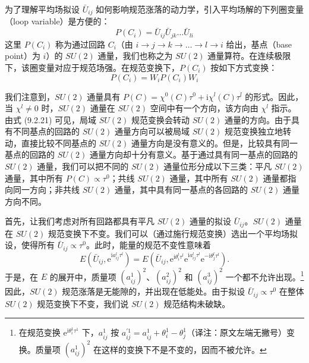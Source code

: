 为了理解平均场拟设 $\bar{U}_{ij}$ 如何影响规范涨落的动力学，引入平均场解的下列圈变量（loop variable）是方便的：
\begin{equation*}
P(C_i)=\bar{U}_{ij}\bar{U}_{jk}\dots\bar{U}_{li}
\tag{9.2.20}
\end{equation*}
这里 $P(C_i)$ 称为通过回路 $C_i$（由 $i\to j\to k\to\dots\to l\to i$ 给出，基点（base point）为 $i$）的 $SU(2)$ 通量，我们也称之为 $SU(2)$ 通量算符。在连续极限下，该圈变量对应于规范场强。在规范变换下，$P(C_i)$ 按如下方式变换：
\begin{equation*}
P(C_i)=W_iP(C_i)W_i
\tag{9.2.21}
\end{equation*}

我们注意到，$SU(2)$ 通量具有 $P(C)=\chi^{0}(C)\tau^{0}+\mathrm{i}\chi^{l}(C)\tau^{l}$ 的形式。因此，当 $\chi^{l}\neq 0$ 时，$SU(2)$ 通量在 $SU(2)$ 空间中有一个方向，该方向由 $\chi^{l}$ 指示。由式 (9.2.21) 可见，局域 $SU(2)$ 规范变换会转动 $SU(2)$ 通量的方向。由于具有不同基点的回路的 $SU(2)$ 通量方向可以被局域 $SU(2)$ 规范变换独立地转动，直接比较不同基点的 $SU(2)$ 通量方向是没有意义的。但是，比较具有同一基点的回路的 $SU(2)$ 通量方向却十分有意义。基于通过具有同一基点的回路的 $SU(2)$ 通量，我们可以把不同的 $SU(2)$ 通量位形分成以下三类：平凡 $SU(2)$ 通量，其中所有 $P(C)\propto\tau^{0}$；共线 $SU(2)$ 通量，其中所有 $SU(2)$ 通量都指向同一方向；非共线 $SU(2)$ 通量，其中具有同一基点的各回路的 $SU(2)$ 通量方向不同。

首先，让我们考虑对所有回路都具有平凡 $SU(2)$ 通量的拟设 $\bar{U}_{ij}$。$SU(2)$ 通量在 $SU(2)$ 规范变换下不变。我们可以（通过施行规范变换）选出一个平均场拟设，使得所有 $\bar{U}_{ij}\propto\tau^{0}$。此时，能量的规范不变性意味着
\begin{equation*}
E(\bar{U}_{ij},\mathrm{e}^{\mathrm{i}a_{ij}^{l}\tau^{l}})=E(\bar{U}_{ij},\mathrm{e}^{\mathrm{i}\theta_i^{l}\tau^{l}}\mathrm{e}^{\mathrm{i}a_{ij}^{l}\tau^{l}}\mathrm{e}^{-\mathrm{i}\theta_j^{l}\tau^{l}}).
\tag{9.2.22}
\end{equation*}
于是，在 $E$ 的展开中，质量项 $(a_{ij}^{1})^{2}$、$(a_{ij}^{2})^{2}$ 和 $(a_{ij}^{3})^{2}$ 一个都不允许出现。\footnote{在规范变换 $\mathrm{e}^{\mathrm{i}\theta_i^{1}\tau^{1}}$ 下，$a_{ij}^{1}$ 按 $a_{ij}^{\prime 1}=a_{ij}^{1}+\theta_i^{1}-\theta_j^{1}$（译注：原文左端无撇号）变换。质量项 $(a_{ij}^{1})^{2}$ 在这样的变换下不是不变的，因而不被允许。}因此，$SU(2)$ 规范涨落是无能隙的，并出现在低能处。由于拟设 $\bar{U}_{ij}\propto\tau^{0}$ 在整体 $SU(2)$ 规范变换下不变，我们说 $SU(2)$ 规范结构未破缺。

